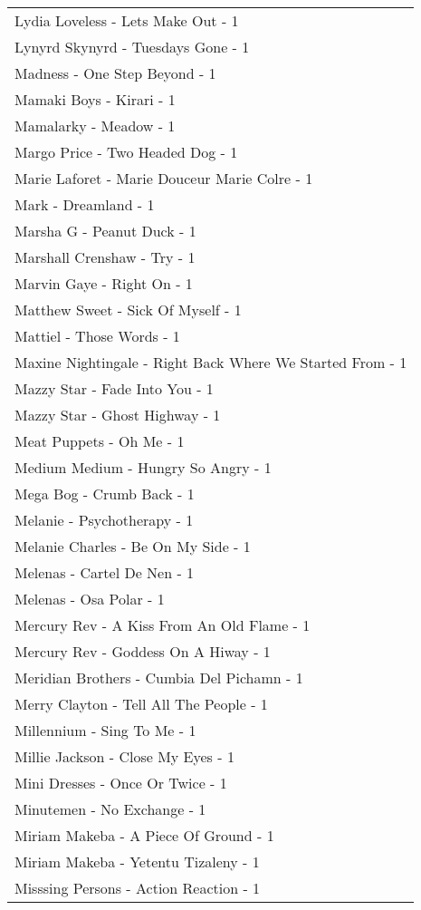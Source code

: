 \documentclass[
]{article}
\begin{document}
\begin{longtable}{l}
Lydia Loveless - Lets Make Out - 1 \\ 
Lynyrd Skynyrd - Tuesdays Gone - 1 \\ 
Madness - One Step Beyond - 1 \\ 
Mamaki Boys - Kirari - 1 \\ 
Mamalarky - Meadow - 1 \\ 
Margo Price - Two Headed Dog - 1 \\ 
Marie Laforet - Marie Douceur Marie Colre - 1 \\ 
Mark - Dreamland - 1 \\ 
Marsha G - Peanut Duck - 1 \\ 
Marshall Crenshaw - Try - 1 \\ 
Marvin Gaye - Right On - 1 \\ 
Matthew Sweet - Sick Of Myself - 1 \\ 
Mattiel - Those Words - 1 \\ 
Maxine Nightingale - Right Back Where We Started From - 1 \\ 
Mazzy Star - Fade Into You - 1 \\ 
Mazzy Star - Ghost Highway - 1 \\ 
Meat Puppets - Oh Me - 1 \\ 
Medium Medium - Hungry So Angry - 1 \\ 
Mega Bog - Crumb Back - 1 \\ 
Melanie - Psychotherapy - 1 \\ 
Melanie Charles - Be On My Side - 1 \\ 
Melenas - Cartel De Nen - 1 \\ 
Melenas - Osa Polar - 1 \\ 
Mercury Rev - A Kiss From An Old Flame - 1 \\ 
Mercury Rev - Goddess On A Hiway - 1 \\ 
Meridian Brothers - Cumbia Del Pichamn - 1 \\ 
Merry Clayton - Tell All The People - 1 \\ 
Millennium - Sing To Me - 1 \\ 
Millie Jackson - Close My Eyes - 1 \\ 
Mini Dresses - Once Or Twice - 1 \\ 
Minutemen - No Exchange - 1 \\ 
Miriam Makeba - A Piece Of Ground - 1 \\ 
Miriam Makeba - Yetentu Tizaleny - 1 \\ 
Misssing Persons - Action Reaction - 1 \\ 

\end{longtable}
\end{document}
